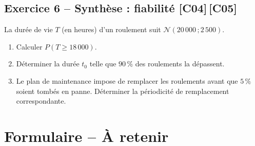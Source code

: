 \documentclass[a4paper,11pt]{article}
\begin{document}
\subsection*{Exercice 6 -- Synthèse : fiabilité \hfill {\normalsize\color{uimmred}[C04]\,[C05]}}
La durée de vie $T$ (en heures) d'un roulement suit $\mathcal{N}(20\,000\,;2\,500)$.
\begin{enumerate}[label=\alph*)]
  \item Calculer $P(T \geq 18\,000)$.
  \item Déterminer la durée $t_0$ telle que $90\,\%$ des roulements la dépassent.
  \item Le plan de maintenance impose de remplacer les roulements avant que $5\,\%$ soient tombés en panne. Déterminer la périodicité de remplacement correspondante.
\end{enumerate}

\newpage
\section*{Formulaire -- À retenir}
\end{document}
